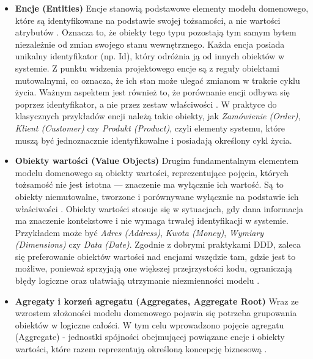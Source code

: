 \begin{itemize}
    \item \textbf{Encje (Entities)} \newline
    Encje stanowią podstawowe elementy modelu domenowego, które są identyfikowane na podstawie swojej tożsamości, a nie wartości atrybutów \cite{evans2004ddd}. Oznacza to, że obiekty tego typu pozostają tym samym bytem niezależnie od zmian swojego stanu wewnętrznego. Każda encja posiada unikalny identyfikator (np. Id), który odróżnia ją od innych obiektów w systemie.
    \newline
    Z punktu widzenia projektowego encje są z reguły obiektami mutowalnymi, co oznacza, że ich stan może ulegać zmianom w trakcie cyklu życia. Ważnym aspektem jest również to, że porównanie encji odbywa się poprzez identyfikator, a nie przez zestaw właściwości \cite{vernon2013ddd}.
    \newline
    W praktyce do klasycznych przykładów encji należą takie obiekty, jak \textit{Zamówienie (Order)}, \textit{Klient (Customer)} czy \textit{Produkt (Product)}, czyli elementy systemu, które muszą być jednoznacznie identyfikowalne i posiadają określony cykl życia.
    \item \textbf{Obiekty wartości (Value Objects)} \newline
    Drugim fundamentalnym elementem modelu domenowego są obiekty wartości, reprezentujące pojęcia, których tożsamość nie jest istotna — znaczenie ma wyłącznie ich wartość. Są to obiekty niemutowalne, tworzone i porównywane wyłącznie na podstawie ich właściwości \cite{evans2004ddd}\cite{khononov2021ddd}.
    \newline
    Obiekty wartości stosuje się w sytuacjach, gdy dana informacja ma znaczenie kontekstowe i nie wymaga trwałej identyfikacji w systemie. Przykładem może być \textit{Adres (Address)}, \textit{Kwota (Money)}, \textit{Wymiary (Dimensions)} czy \textit{Data (Date)}.
    \newline
    Zgodnie z dobrymi praktykami DDD, zaleca się preferowanie obiektów wartości nad encjami wszędzie tam, gdzie jest to możliwe, ponieważ sprzyjają one większej przejrzystości kodu, ograniczają błędy logiczne oraz ułatwiają utrzymanie niezmienności modelu \cite{vernon2013ddd}.
    \item \textbf{Agregaty i korzeń agregatu (Aggregates, Aggregate Root)} \newline
    Wraz ze wzrostem złożoności modelu domenowego pojawia się potrzeba grupowania obiektów w logiczne całości. W tym celu wprowadzono pojęcie agregatu (Aggregate) - jednostki spójności obejmującej powiązane encje i obiekty wartości, które razem reprezentują określoną koncepcję biznesową \cite{evans2004ddd}\cite{vernon2013ddd}.

\end{itemize}
